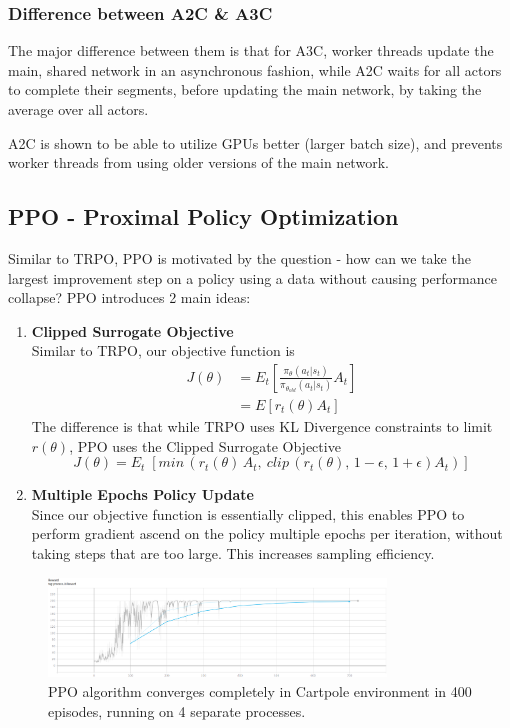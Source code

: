 \documentclass[11pt]{article} %
\begin{document}
\subsubsection{Difference between A2C \& A3C}
The major difference between them is that for A3C, worker threads update the main, shared network in an asynchronous fashion, while A2C waits for all actors to complete their segments, before updating the main network, by taking the average over all actors.

A2C is shown to be able to utilize GPUs better (larger batch size), and prevents worker threads from using older versions of the main network.

\subsection{PPO - Proximal Policy Optimization}
Similar to TRPO, PPO is motivated by the question - how can we take the largest improvement step on a policy using a data without causing performance collapse? PPO introduces 2 main ideas:
\begin{enumerate}
    \item \textbf{Clipped Surrogate Objective}\\
    Similar to TRPO, our objective function is 
    \begin{equation*}
    \begin{split}
        J(\theta) &= E_t[\frac{\pi_\theta(a_t|s_t)}{\pi_{\theta_{old}}(a_t|s_t)}A_t] \\
        &= E[r_t(\theta)A_t]
    \end{split}
    \end{equation*}
    The difference is that while TRPO uses KL Divergence constraints to limit $r(\theta)$, PPO uses the Clipped Surrogate Objective
    \begin{equation*}
        J(\theta) = E_t\;[min\,(r_t(\theta)\,A_t, \: clip\,(r_t(\theta),\, 1-\epsilon,\, 1+\epsilon)A_t)]
    \end{equation*}
    \item \textbf{Multiple Epochs Policy Update}\\
    Since our objective function is essentially clipped, this enables PPO to perform gradient ascend on the policy multiple epochs per iteration, without taking steps that are too large. This increases sampling efficiency.
\end{enumerate}
\begin{figure}
    \centering
    \includegraphics[width=0.8\textwidth]{images/ppo_cartpole.png}
    \caption{PPO algorithm converges completely in Cartpole environment in 400 episodes, running on 4 separate processes.}
    \label{fig:my_label}
\end{figure}
\end{document}
